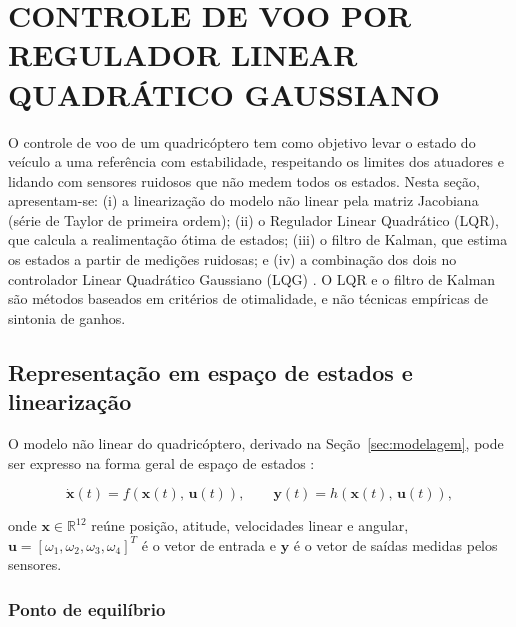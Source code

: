 \section{CONTROLE DE VOO POR REGULADOR LINEAR QUADRÁTICO GAUSSIANO}\label{sec:controle}

O controle de voo de um quadricóptero tem como objetivo levar o estado do veículo a uma referência com estabilidade, respeitando os limites dos atuadores e lidando com sensores ruidosos que não medem todos os estados. Nesta seção, apresentam-se: (i) a linearização do modelo não linear pela matriz Jacobiana (série de Taylor de primeira ordem); (ii) o Regulador Linear Quadrático (LQR), que calcula a realimentação ótima de estados; (iii) o filtro de Kalman, que estima os estados a partir de medições ruidosas; e (iv) a combinação dos dois no controlador Linear Quadrático Gaussiano (LQG) \cite{athans1971,anderson1990}. O LQR e o filtro de Kalman são métodos baseados em critérios de otimalidade, e não técnicas empíricas de sintonia de ganhos.

\subsection{Representação em espaço de estados e linearização}\label{subsec:espaco_estados}

O modelo não linear do quadricóptero, derivado na Seção~\ref{sec:modelagem}, pode ser expresso na forma geral de espaço de estados \cite{ogata2010}:

\begin{equation}\label{eq:ss_geral}
\dot{\mathbf{x}}(t) = f(\mathbf{x}(t),\, \mathbf{u}(t)), \qquad \mathbf{y}(t) = h(\mathbf{x}(t),\, \mathbf{u}(t)),
\end{equation}

\noindent onde $\mathbf{x} \in \mathbb{R}^{12}$ reúne posição, atitude, velocidades linear e angular, $\mathbf{u} = [\omega_1, \omega_2, \omega_3, \omega_4]^T$ é o vetor de entrada e $\mathbf{y}$ é o vetor de saídas medidas pelos sensores.

\subsubsection{Ponto de equilíbrio}

